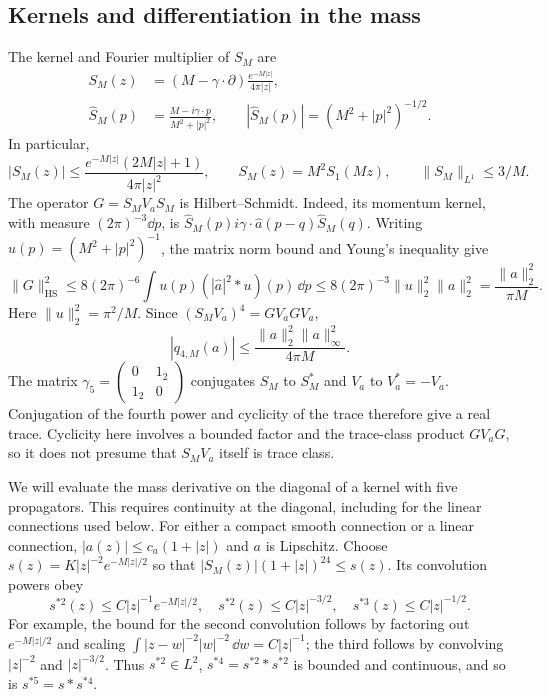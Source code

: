 \documentclass[11pt,letterpaper,reqno]{amsart}
\begin{document}
\subsection{Kernels and differentiation in the mass}

The kernel and Fourier multiplier of $S_M$ are
\begin{align}
 S_M(z)&=(M-\gamma\cdot\partial)
              \frac{e^{-M|z|}}{4\pi|z|},\label{eq:probe-free-kernel}\\
 \widehat S_M(p)&=\frac{M-i\gamma\cdot p}{M^2+|p|^2},\qquad
 |\widehat S_M(p)|=(M^2+|p|^2)^{-1/2}.
 \label{eq:probe-free-symbol}
\end{align}
In particular,
\[
 |S_M(z)|\le\frac{e^{-M|z|}(2M|z|+1)}{4\pi|z|^2},\qquad
 S_M(z)=M^2S_1(Mz),\qquad \|S_M\|_{L^1}\le3/M.
\]
The operator $G=S_MV_aS_M$ is Hilbert--Schmidt. Indeed, its momentum
kernel, with measure $(2\pi)^{-3}\dd p$, is
$\widehat S_M(p)i\gamma\cdot\widehat a(p-q)\widehat S_M(q)$.
Writing $u(p)=(M^2+|p|^2)^{-1}$, the matrix norm bound and Young's
inequality give
\[
 \|G\|_{\mathrm{HS}}^2
 \le8(2\pi)^{-6}\int u(p)(|\widehat a|^2*u)(p)\,\dd p
 \le8(2\pi)^{-3}\|u\|_2^2\|a\|_2^2
 =\frac{\|a\|_2^2}{\pi M}.
\]
Here $\|u\|_2^2=\pi^2/M$. Since $(S_MV_a)^4=GV_aGV_a$,
\begin{equation}\label{eq:probe-trace-bound}
 |q_{4,M}(a)|\le\frac{\|a\|_2^2\|a\|_\infty^2}{4\pi M}.
\end{equation}
The matrix $\gamma_5=\left(\begin{smallmatrix}0&1_2\\1_2&0\end{smallmatrix}\right)$
conjugates $S_M$ to $S_M^*$ and $V_a$ to $V_a^*=-V_a$.
Conjugation of the fourth power and cyclicity of the trace therefore
give a real trace. Cyclicity here involves a bounded factor and the
trace-class product $GV_aG$, so it does not presume that $S_MV_a$
itself is trace class.

We will evaluate the mass derivative on the diagonal of a kernel with
five propagators. This requires continuity at the diagonal, including
for the linear connections used below. For either a compact smooth
connection or a linear connection, $|a(z)|\le c_a(1+|z|)$ and
$a$ is Lipschitz. Choose
$s(z)=K|z|^{-2}e^{-M|z|/2}$ so that
$|S_M(z)|(1+|z|)^{24}\le s(z)$. Its convolution powers obey
\begin{equation}\label{eq:probe-convolutions}
 s^{*2}(z)\le C|z|^{-1}e^{-M|z|/2},\quad
 s^{*2}(z)\le C|z|^{-3/2},\quad
 s^{*3}(z)\le C|z|^{-1/2}.
\end{equation}
For example, the bound for the second convolution follows by factoring
out $e^{-M|z|/2}$ and scaling
$\int|z-w|^{-2}|w|^{-2}\,\dd w=C|z|^{-1}$; the third follows by
convolving $|z|^{-2}$ and $|z|^{-3/2}$. Thus $s^{*2}\in L^2$,
$s^{*4}=s^{*2}*s^{*2}$ is bounded and continuous, and so is
$s^{*5}=s*s^{*4}$.
\end{document}
